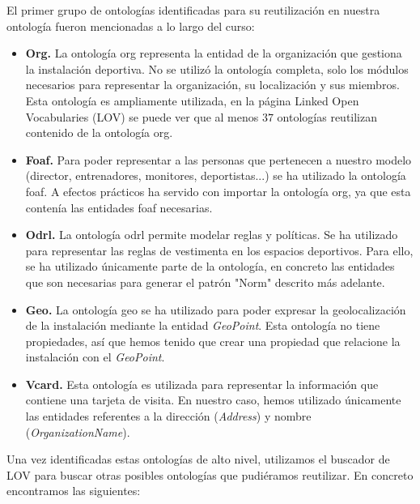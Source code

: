 \documentclass[a4paper,12pt]{article}
\begin{document}
	El primer grupo de ontologías identificadas para su reutilización en nuestra ontología fueron mencionadas a lo largo del curso:
	\begin{itemize}
		\item \textbf{Org.} La ontología org representa la entidad de la organización que gestiona la instalación deportiva. No se utilizó la ontología completa, solo los módulos necesarios para representar la organización, su localización y sus miembros. Esta ontología es ampliamente utilizada, en la página Linked Open Vocabularies (LOV) \cite{lov} se puede ver que al menos $37$ ontologías reutilizan contenido de la ontología org.
		\item \textbf{Foaf.} Para poder representar a las personas que pertenecen a nuestro modelo (director, entrenadores, monitores, deportistas...) se ha utilizado la ontología foaf. A efectos prácticos ha servido con importar la ontología org, ya que esta contenía las entidades foaf necesarias.
		\item \textbf{Odrl.} La ontología odrl permite modelar reglas y políticas. Se ha utilizado para representar las reglas de vestimenta en los espacios deportivos. Para ello, se ha utilizado únicamente parte de la ontología, en concreto las entidades que son necesarias para generar el patrón "Norm" descrito más adelante.
		\item \textbf{Geo.} La ontología geo se ha utilizado para poder expresar la geolocalización de la instalación mediante la entidad \textit{GeoPoint}. Esta ontología no tiene propiedades, así que hemos tenido que crear una propiedad que relacione la instalación con el \textit{GeoPoint}. 
		\item \textbf{Vcard.} Esta ontología es utilizada para representar la información que contiene una tarjeta de visita. En nuestro caso, hemos utilizado únicamente las entidades referentes a la dirección (\textit{Address}) y nombre (\textit{OrganizationName}).
		
	\end{itemize}
	Una vez identificadas estas ontologías de alto nivel, utilizamos el buscador de LOV para buscar otras posibles ontologías que pudiéramos reutilizar. En concreto encontramos las siguientes:
	
\end{document}
